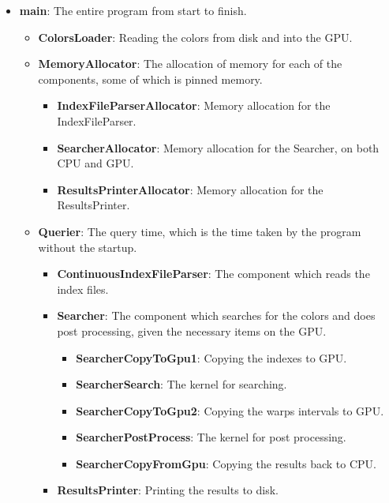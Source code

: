 \begin{itemize}
  \item \textbf{main}: The entire program from start to finish.
  \begin{itemize}
    \item \textbf{ColorsLoader}: Reading the colors from disk and into the GPU.
    \item \textbf{MemoryAllocator}: The allocation of memory for each of the components, some of which is pinned memory.
    \begin{itemize}
      \item \textbf{IndexFileParserAllocator}: Memory allocation for the IndexFileParser.
      \item \textbf{SearcherAllocator}: Memory allocation for the Searcher, on both CPU and GPU.
      \item \textbf{ResultsPrinterAllocator}: Memory allocation for the ResultsPrinter.
    \end{itemize}
    \item \textbf{Querier}: The query time, which is the time taken by the program without the startup.
    \begin{itemize}
      \item \textbf{ContinuousIndexFileParser}: The component which reads the index files.
      \item \textbf{Searcher}: The component which searches for the colors and does post processing, given the necessary items on the GPU.
      \begin{itemize}
        \item \textbf{SearcherCopyToGpu1}: Copying the indexes to GPU.
        \item \textbf{SearcherSearch}: The kernel for searching.
        \item \textbf{SearcherCopyToGpu2}: Copying the warps intervals to GPU.
        \item \textbf{SearcherPostProcess}: The kernel for post processing.
        \item \textbf{SearcherCopyFromGpu}: Copying the results back to CPU.
      \end{itemize}
    \item \textbf{ResultsPrinter}: Printing the results to disk.
    \end{itemize}
  \end{itemize}
\end{itemize}
